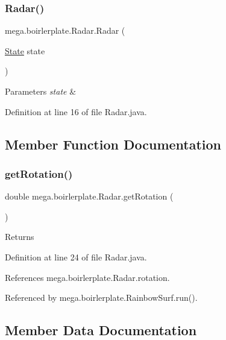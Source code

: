 \subsubsection{\texorpdfstring{Radar()}{Radar()}}
{\footnotesize\ttfamily mega.\+boirlerplate.\+Radar.\+Radar (\begin{DoxyParamCaption}\item[{\hyperlink{classmega_1_1boirlerplate_1_1_state}{State}}]{state }\end{DoxyParamCaption})}


\begin{DoxyParams}{Parameters}
{\em state} & \\
\hline
\end{DoxyParams}


Definition at line 16 of file Radar.\+java.



\subsection{Member Function Documentation}
\mbox{\label{classmega_1_1boirlerplate_1_1_radar_ab1570cfd91730f9c0e3fe160ff182310}} 
\subsubsection{\texorpdfstring{get\+Rotation()}{getRotation()}}
{\footnotesize\ttfamily double mega.\+boirlerplate.\+Radar.\+get\+Rotation (\begin{DoxyParamCaption}{ }\end{DoxyParamCaption})}

\begin{DoxyReturn}{Returns}

\end{DoxyReturn}


Definition at line 24 of file Radar.\+java.



References mega.\+boirlerplate.\+Radar.\+rotation.



Referenced by mega.\+boirlerplate.\+Rainbow\+Surf.\+run().



\subsection{Member Data Documentation}
\mbox{\label{classmega_1_1boirlerplate_1_1_radar_a1667df6cb84933a744aa36582cc4dd28}} 
